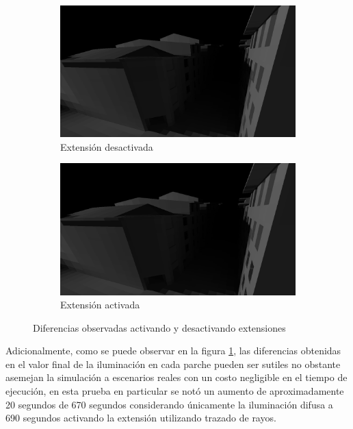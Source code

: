 \begin{figure}[H]
	\centering
	\begin{subfigure}{0.47\textwidth}
		\includegraphics[width=1\linewidth]{assets/sdif}
		\caption{Extensión desactivada}
	\end{subfigure}
	\begin{subfigure}{0.47\textwidth}
		\includegraphics[width=1\linewidth]{assets/sspec}
		\caption{Extensión activada}
	\end{subfigure}
	\caption{Diferencias observadas activando y desactivando extensiones}
	\label{img:difspecstreet}
\end{figure}

Adicionalmente, como se puede observar en la figura \ref{img:difspecstreet}, las diferencias obtenidas en el valor final de la iluminación en cada parche pueden ser sutiles no obstante asemejan la simulación a escenarios reales con un costo negligible en el tiempo de ejecución, en esta prueba en particular se notó un aumento de aproximadamente 20 segundos de 670 segundos considerando únicamente la iluminación difusa a 690 segundos activando la extensión utilizando trazado de rayos.

